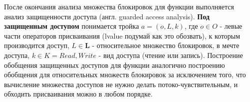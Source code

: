 После окончания анализа множества блокировок для функции выполняется анализ защищенности доступа (англ. guarded access analysis). \textbf{Под защищенным доступом} понимается тройка $a = (o, L, k)$, где $o \in O$ - левые части операторов присваивания (lvalue подумай как это обозвать), к которым производится доступ, $L \in \mathbf{L}$ - относительное множество блокировок, в мечте доступа, $k \in K = {Read, Write}$ - вид доступа (чтение или запись). Построение обобщения защищенных доступов для функции аналогично построению обобщения для относительных множеств блокировок за исключением того, что вычисление множества доступов не нужно делать потоко-чувствительным, и обходить присваивания можно в любом порядке.

